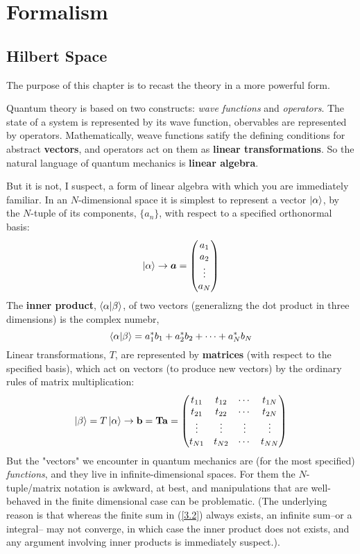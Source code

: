 \chapter{Formalism}
\section{Hilbert Space}

The purpose of this chapter is to recast the theory in a more powerful form.

Quantum theory is based on two constructs: \textit{wave functions} and \textit{operators}. The state of a system is represented by its wave function, obervables are represented by operators. Mathematically, weave functions satify the defining conditions for abstract \textbf{vectors}, and operators act on them as \textbf{linear transformations}. So the natural language of quantum mechanics is \textbf{linear algebra}.

But it is not, I suspect, a form of linear algebra with which you are immediately familiar. In an $N$-dimensional space it is simplest to represent a vector $\ket{\alpha}$, by the $N$-tuple of its components, $\{a_n\}$, with respect to a specified orthonormal basis:
\begin{equation}\label{3.1}
	\ket{\alpha}\to\vb*{a}=\mqty(a_1\\a_2\\\vdots \\a_N)
\end{equation}
The \textbf{inner product}, $\braket{\alpha}{\beta}$, of two vectors (generalizng the dot product in three dimensions) is the complex numebr,
\begin{equation}\label{3.2}
	\braket{\alpha}{\beta}=a_1^*b_1+a_2^*b_2+\cdots +a_N^*b_N
\end{equation}
Linear transformations, $T$, are represented by \textbf{matrices} (with respect to the specified basis), which act on vectors (to produce new vectors) by the ordinary rules of matrix multiplication:
\begin{equation}\label{3.3}
	\ket{\beta}=T\ket{\alpha}\to \vb{b}=\vb{T}\vb{a}=\mqty(t_{11}&t_{12}&\cdots & t_{1N}\\
	t_{21}&t_{22}&\cdots&t_{2N}\\
	\vdots&\vdots&\vdots&\vdots\\
	t_{N1}&t_{N2}& \cdots &t_{NN})
\end{equation}
But the "vectors" we encounter in quantum mechanics are (for the most specified) \textit{functions}, and they live in infinite-dimensional spaces. For them the $N$-tuple/matrix notation is awkward, at best, and manipulations that are well-behaved in the finite dimensional case can be problematic. (The underlying reason is that whereas the finite sum in (\ref{3.2}) always exists, an infinite sum--or a integral-- may not converge, in which case the inner product does not exists, and any argument involving inner products is immediately suspect.).

